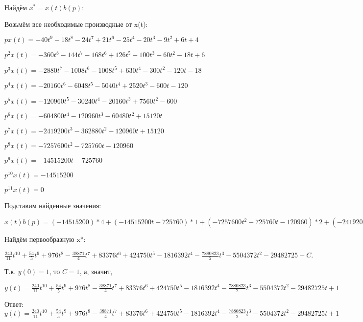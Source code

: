 \documentclass{article}
\begin{document}
{{{{{{Найдём $x^*=x(t)b(p)$:

Возьмём все необходимые производные от x(t):

$px(t)=-40t^{9}-18t^{8}-24t^{7}+21t^{6}-25t^{4}-20t^{3}-9t^{2}+6t+4$

$p^2x(t)=-360t^{8}-144t^{7}-168t^{6}+126t^{5}-100t^{3}-60t^{2}-18t+6$

$p^3x(t)=-2880t^{7}-1008t^{6}-1008t^{5}+630t^{4}-300t^{2}-120t-18$

$p^4x(t)=-20160t^{6}-6048t^{5}-5040t^{4}+2520t^{3}-600t-120$

$p^5x(t)=-120960t^{5}-30240t^{4}-20160t^{3}+7560t^{2}-600$

$p^6x(t)=-604800t^{4}-120960t^{3}-60480t^{2}+15120t$

$p^7x(t)=-2419200t^{3}-362880t^{2}-120960t+15120$

$p^8x(t)=-7257600t^{2}-725760t-120960$

$p^9x(t)=-14515200t-725760$

$p^10x(t)=-14515200$

$p^11x(t)=0$

Подставим найденные значения:

$x(t)b(p) = (-14515200)*4+(-14515200t-725760)*1+(-7257600t^{2}-725760t-120960)*2+(-2419200t^{3}-362880t^{2}-120960t+15120)*4+(-604800t^{4}-120960t^{3}-60480t^{2}+15120t)*(-4)+(-120960t^{5}-30240t^{4}-20160t^{3}+7560t^{2}-600)*(-5)+(-20160t^{6}-6048t^{5}-5040t^{4}+2520t^{3}-600t-120)*4+(-2880t^{7}-1008t^{6}-1008t^{5}+630t^{4}-300t^{2}-120t-18)*(-3)+(-40t^{9}-18t^{8}-24t^{7}+21t^{6}-25t^{4}-20t^{3}-9t^{2}+6t+4)*(-5)+(-40t^{9}-18t^{8}-24t^{7}+21t^{6}-25t^{4}-20t^{3}-9t^{2}+6t+4)*(-1)=240t^{9}+108t^{8}+8784t^{7}-77742t^{6}+583632t^{5}+2548500t^{4}-9081960t^{3}-15761646t^{2}-16513116t$





Найдём первообразную x*:

$\frac{240}{11}t^{10}+\frac{54}{5}t^{9}+976t^{8}-\frac{38871}{4}t^{7}+83376t^{6}+424750t^{5}-1816392t^{4}-\frac{7880823}{2}t^{3}-5504372t^{2}-29482725+C.$

Т.к. $y(0)=1$, то $C=1$, а, значит, 

$y(t)=\frac{240}{11}t^{10}+\frac{54}{5}t^{9}+976t^{8}-\frac{38871}{4}t^{7}+83376t^{6}+424750t^{5}-1816392t^{4}-\frac{7880823}{2}t^{3}-5504372t^{2}-29482725t+1$

Ответ: $y(t) = \frac{240}{11}t^{10}+\frac{54}{5}t^{9}+976t^{8}-\frac{38871}{4}t^{7}+83376t^{6}+424750t^{5}-1816392t^{4}-\frac{7880823}{2}t^{3}-5504372t^{2}-29482725t+1$

}}}}}}
\end{document}
